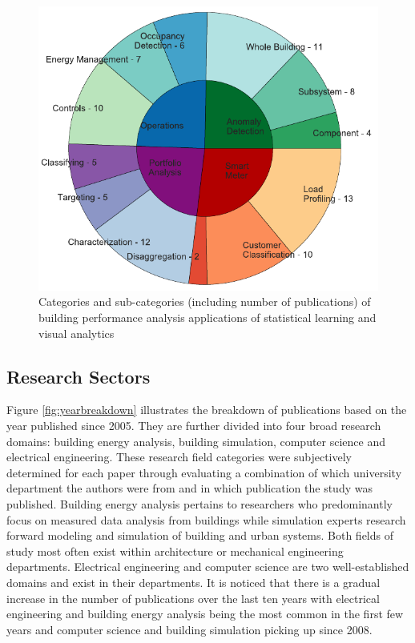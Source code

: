 \begin{figure}[ht!]
\begin{center}
\includegraphics[width=0.7\columnwidth]{figures/PieChart_resized/PieChart_resized}
\caption{Categories and sub-categories (including number of publications) of building performance analysis applications of statistical learning and visual analytics
\label{fig:categoriespie}%
}
\end{center}
\end{figure}

\subsection{Research Sectors}
\label{sec:subsectors}

Figure \ref{fig:yearbreakdown} illustrates the breakdown of publications based on the year published since 2005. They are further divided into four broad research domains: building energy analysis, building simulation, computer science and electrical engineering. These research field categories were subjectively determined for each paper through evaluating a combination of which university department the authors were from and in which publication the study was published. Building energy analysis pertains to researchers who predominantly focus on measured data analysis from buildings while simulation experts research forward modeling and simulation of building and urban systems. Both fields of study most often exist within architecture or mechanical engineering departments. Electrical engineering and computer science are two well-established domains and exist in their departments. It is noticed that there is a gradual increase in the number of publications over the last ten years with electrical engineering and building energy analysis being the most common in the first few years and computer science and building simulation picking up since 2008. 

